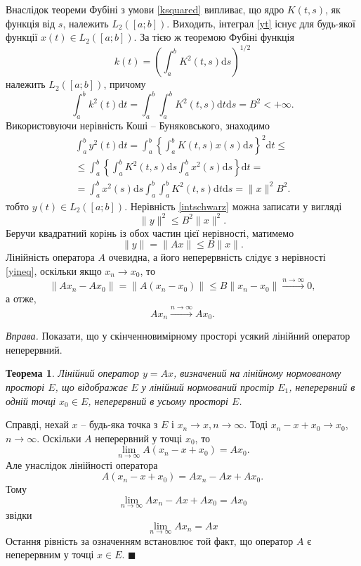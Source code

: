 \documentclass[14pt,twoside]{extreport}
\theoremstyle{mystyle}
\newtheorem{thm}{Теорема}
\renewenvironment{proof}{{\bfseries Доведення.}}{$\blacksquare$}
\numberwithin{equation}{chapter}
\begin{document}
\begin{enumerate}
	Внаслідок теореми Фубіні з умови \eqref{ksquared} випливає, що ядро $K(t, s)$, як функція від $s$, належить $L_2([a; b])$. Виходить, інтеграл \eqref{yt} існує для будь-якої функції $x(t) \in L_2([a; b])$. За тією ж теоремою Фубіні функція
	\[
	k(t)=\left(\int_{a}^{b} K^2(t, s) \mathrm{d}s\right)^{1/2}
	\]
	належить $L_2([a; b])$, причому
	\[
	\int_{a}^{b}k^2(t)\mathrm{d}t=\int_{a}^{b} \int_{a}^{b} K^2 (t, s) \mathrm{d}t \mathrm{d}s = B^2 < +\infty.
	\]
	Використовуючи нерівність Коші -- Буняковського, знаходимо
	\begin{multline}\label{intschwarz}
	\int_{a}^{b}y^2(t)\mathrm{d}t = \int_{a}^{b}\left\{\int_{a}^{b}K(t, s) x(s)\mathrm{d}s\right\}^2\mathrm{d}t\leqslant\\
	\leqslant \int_{a}^{b}\left\{\int_{a}^{b}K^2(t, s)\mathrm{d}s \int_{a}^{b} x^2(s) \mathrm{d}s\right\}\mathrm{d}t=\\
	= \int_{a}^{b} x^2(s) \mathrm{d}s \int_{a}^{b} \int_{a}^{b} K^2 (t, s) \mathrm{d}t \mathrm{d}s = \|x\|^2B^2.
	\end{multline}
	тобто $y(t) \in L_2([a; b])$.
	Нерівність \eqref{intschwarz} можна записати у вигляді
	\[
	\|y\|^2 \leqslant B^2\|x\|^2.
	\]
	Беручи квадратний корінь із обох частин цієї нерівності, матимемо
	\begin{equation}\label{yineq}
	\|y\|=\|Ax\|\leqslant B\|x\|.
	\end{equation}
	Лінійність оператора $A$ очевидна, а його неперервність слідує з нерівності \eqref{yineq}, оскільки якщо $x_n \to x_0$, то
	\[
	\|Ax_n - Ax_0\| = \|A(x_n - x_0)\| \leqslant B \|x_n - x_0\| \xrightarrow{n\to\infty} 0,
	\]
	а отже,
	\[
	Ax_n \xrightarrow{n\to\infty} Ax_0.
	\]
\end{enumerate}

\begin{small}
 \emph{Вправа.} Показати, що у скінченновимірному просторі усякий лінійний оператор неперервний.
\end{small}

\begin{thm}
	Лінійний оператор $y=Ax$, визначений на лінійному нормованому просторі $E$, що відображає $E$ у лінійний нормований простір $E_1$, неперервний в одній точці $x_0\in E$, неперервний в усьому просторі $E$.
\end{thm}
\begin{proof}
	Справді, нехай $x$ -- будь-яка точка з $E$ і $x_n \to x, n\to \infty$. Тоді $x_n - x + x_0 \to x_0$, $n \to \infty$. Оскільки $A$ неперервний у точці $x_0$, то
	\[
	\lim_{n \to \infty} A(x_n - x + x_0) = Ax_0.
	\]
	Але унаслідок лінійності оператора
	\[
	A(x_n - x + x_0) = Ax_n - Ax + Ax_0.
	\]
	Тому
	\[
	\lim_{n \to \infty} Ax_n - Ax + Ax_0 = Ax_0
	\]
	звідки
	\[
	\lim_{n \to \infty} Ax_n =Ax
	\]
	Остання рівність за означенням встановлює той факт, що оператор $A$ є неперервним у точці $x\in E$.
\end{proof}
\end{document}

